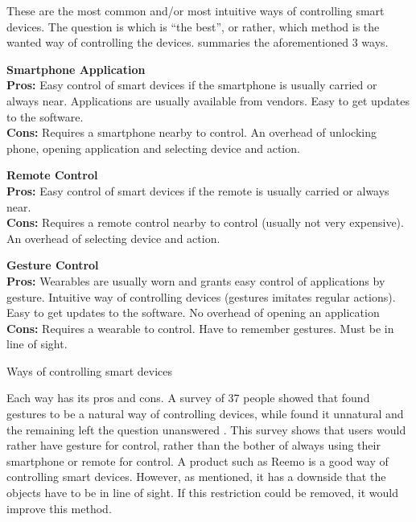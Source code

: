These are the most common and/or most intuitive ways of controlling smart devices. 
The question is which is ``the best'', or rather, which method is the wanted way of controlling the devices.
 summaries the aforementioned 3 ways. 

\begin{table}[!htb]
    \centering
    \parbox[t][][t]{0.3\textwidth}{
        \textbf{Smartphone Application}\\
        \textbf{Pros:} Easy control of smart devices if the smartphone is usually carried or always near. 
                       Applications are usually available from vendors. 
                       Easy to get updates to the software. \\
        \textbf{Cons:} Requires a smartphone nearby to control. 
                       An overhead of unlocking phone, opening application and selecting device and action.
    }\quad
    \parbox[t][][t]{0.3\textwidth}{
        \textbf{Remote Control}\\
        \textbf{Pros:} Easy control of smart devices if the remote is usually carried or always near. \\
        \textbf{Cons:} Requires a remote control nearby to control (usually not very expensive). 
                       An overhead of selecting device and action.
    }\quad
    \parbox[t][][t]{0.3\textwidth}{
        \textbf{Gesture Control}\\
        \textbf{Pros:} Wearables are usually worn and grants easy control of applications by gesture.
                       Intuitive way of controlling devices (gestures imitates regular actions).
                       Easy to get updates to the software. 
                       No overhead of opening an application\\
        \textbf{Cons:} Requires a wearable to control. 
                       Have to remember gestures.
                       Must be in line of sight. 
    }
    \caption{Ways of controlling smart devices}
    \label{tbl:smartcontrol}
\end{table}

Each way has its pros and cons. 
A survey of 37 people showed that  found gestures to be a natural way of controlling devices, 
while  found it unnatural and the remaining left the question unanswered \cite{Kela2006}. 
This survey shows that users would rather have gesture for control, 
rather than the bother of always using their smartphone or remote for control.  
A product such as Reemo is a good way of controlling smart devices. 
However, as mentioned, it has a downside that the objects have to be in line of sight. 
If this restriction could be removed, it would improve this method. 

